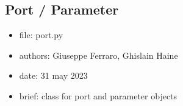 \documentclass[letterpaper,10pt,english]{sphinxmanual}
\begin{document}
\subsection{Port / Parameter}
\label{\detokenize{scrimp:module-scrimp.port}}\label{\detokenize{scrimp:port-parameter}}\begin{itemize}
\item {} 
\sphinxAtStartPar
file:             port.py

\item {} 
\sphinxAtStartPar
authors:          Giuseppe Ferraro, Ghislain Haine

\item {} 
\sphinxAtStartPar
date:             31 may 2023

\item {} 
\sphinxAtStartPar
brief:            class for port and parameter objects

\end{itemize}
\end{document}
